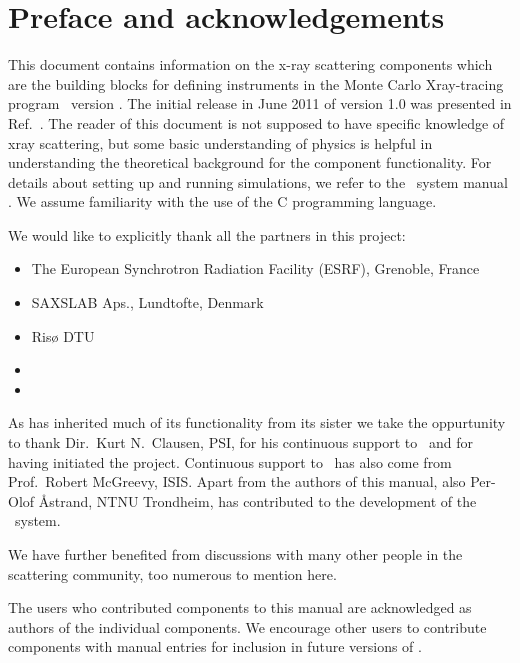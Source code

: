 
\chapter*{Preface and acknowledgements}
This document contains information on the x-ray scattering components
which are the building blocks for defining instruments
in the Monte Carlo Xray-tracing program \MCS\ version \version . The initial
release in June 2011 of version 1.0 was presented in Ref.~\cite{nn_10_20}.
The reader of this
document is not supposed to have specific knowledge of xray scattering,
but some basic understanding of physics is helpful in
understanding the theoretical background for the component functionality.
For details about setting up and running simulations, we refer to
the \MCX\ system manual \cite{mcxtracemanual}.
We assume familiarity with the use of
the C programming language.

We would like to explicitly thank all the partners in this project:
\begin{itemize}
\item The European Synchrotron Radiation Facility (ESRF), Grenoble, France
\item SAXSLAB Aps., Lundtofte, Denmark
\item Risø DTU
\item \NBIlong
\item \Lifelong
\end{itemize}

As
\MCX has inherited much of its functionality from its sister \MCS we take the oppurtunity to thank 
Dir.~Kurt N.~Clausen, PSI, for his continuous
support to \MCS\ and for having initiated the project.
Continuous support to \MCS\ has also come from Prof.~Robert McGreevy, ISIS.
Apart from the authors of this manual, also Per-Olof \AA strand, NTNU Trondheim,
has contributed to the development of the \MCS\ system.

We have further benefited
from discussions with many other people in the scattering
community, too numerous to mention here.

The users who contributed components to this manual are acknowledged
as authors of the individual components. We encourage other
users to contribute components with manual entries for inclusion in
future versions of \MCX.

